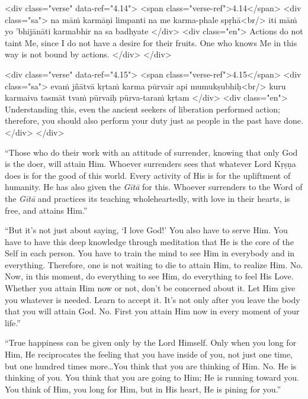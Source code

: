 \begin{html}
<div class="verse" data-ref="4.14">
  <span class="verse-ref">4.14</span>
  <div class="sa">
    na māṁ karmāṇi limpanti na me karma-phale spṛhā<br/>
    iti māṁ yo ’bhijānāti karmabhir na sa badhyate
  </div>
  <div class="en">
    Actions do not taint Me, since I do not have a desire for their fruits. One who knows Me in this way is not bound by actions.
  </div>
</div>
\end{html}



\begin{html}
<div class="verse" data-ref="4.15">
  <span class="verse-ref">4.15</span>
  <div class="sa">
    evaṁ jñātvā kṛtaṁ karma pūrvair api mumukṣubhiḥ<br/>
    kuru karmaiva tasmāt tvaṁ pūrvaiḥ pūrva-taraṁ kṛtam
  </div>
  <div class="en">
    Understanding this, even the ancient seekers of liberation performed action; therefore, you should also perform your duty just as people in the past have done.
  </div>
</div>
\end{html}


\enquote{Those who do their work with an attitude of surrender, knowing that only God is the doer, will attain Him. Whoever surrenders sees that whatever Lord Kṛṣṇa does is for the good of this world. Every activity of His is for the upliftment of humanity. He has also given the \textit{Gītā} for this. Whoever surrenders to the Word of the \textit{Gītā} and practices its teaching wholeheartedly, with love in their hearts, is free, and attains Him.}

\enquote{But it’s not just about saying, \enquote{I love God!} You also have to serve Him. You have to have this deep knowledge through meditation that He is the core of the Self in each person. You have to train the mind to see Him in everybody and in everything. Therefore, one is not waiting to die to attain Him, to realize Him. No. Now, in this moment, do everything to see Him, do everything to feel His Love. Whether you attain Him now or not, don’t be concerned about it. Let Him give you whatever is needed. Learn to accept it. It’s not only after you leave the body that you will attain God. No. First you attain Him now in every moment of your life.}


\enquote{True happiness can be given only by the Lord Himself. Only when you long for Him, He reciprocates the feeling that you have inside of you, not just one time, but one hundred times more\ldots You think that you are thinking of Him. No. He is thinking of you. You think that you are going to Him; He is running toward you. You think of Him, you long for Him, but in His heart, He is pining for you.}

